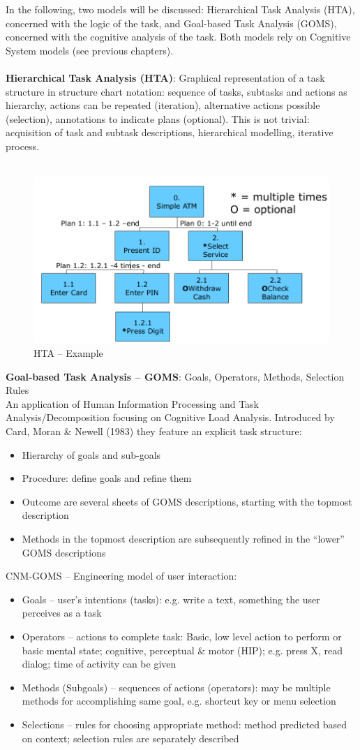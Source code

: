 In the following, two models will be discussed: Hierarchical Task Analysis (HTA), concerned with the logic of the task, and Goal-based Task Analysis (GOMS), concerned with the cognitive analysis of the task. Both models rely on Cognitive System models (see previous chapters).\\ \\ 
\textbf{Hierarchical Task Analysis (HTA)}: 
Graphical representation of a task structure in structure chart notation: sequence of tasks, subtasks and actions as hierarchy, actions can be repeated (iteration), alternative actions possible (selection), annotations to indicate plans (optional). This is not trivial: acquisition of task and subtask descriptions, hierarchical modelling, iterative process.\\\\
\begin{figure}[h!]
	\centering
	\includegraphics[width=.5\textwidth]{img/ch05_hta.png}
	\caption{HTA -- Example}
	\label{hta}
\end{figure}
\textbf{Goal-based Task Analysis -- GOMS}: Goals, Operators, Methods, Selection Rules\\
An application of Human Information Processing and Task Analysis/Decomposition focusing on Cognitive Load Analysis. Introduced by Card, Moran \& Newell (1983) they feature an explicit task structure:
\begin{itemize}
\item Hierarchy of goals and sub-goals
\item Procedure: define goals and refine them
\item Outcome are several sheets of GOMS descriptions, starting with the topmost description
\item Methods in the topmost description are subsequently refined in the ``lower'' GOMS descriptions
\end{itemize}
CNM-GOMS -- Engineering model of user interaction:
\begin{itemize}
\item Goals -- user's intentions (tasks): e.g. write a text, something the user perceives as a task
\item Operators -- actions to complete task: Basic, low level action to perform or basic mental state; cognitive, perceptual \& motor (HIP); e.g. press X, read dialog; time of activity can be given
\item Methods (Subgoals) -- sequences of actions (operators): may be multiple methods for accomplishing same goal, e.g. shortcut key or menu selection
\item Selections -- rules for choosing appropriate method: method predicted based on context; selection rules are separately described
\end{itemize}
